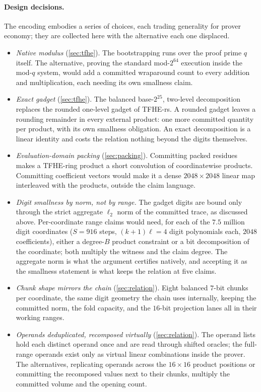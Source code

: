 \documentclass[11pt]{article}
\begin{document}
\paragraph{Design decisions.} The encoding embodies a series of choices, each trading generality for prover economy; they are collected here with the alternative each one displaced.
\begin{itemize}
  \item \emph{Native modulus} (\cref{sec:tfhe}). The bootstrapping runs over the proof prime $q$ itself. The alternative, proving the standard mod-$2^{64}$ execution inside the mod-$q$ system, would add a committed wraparound count to every addition and multiplication, each needing its own smallness claim.
  \item \emph{Exact gadget} (\cref{sec:tfhe}). The balanced base-$2^{25}$, two-level decomposition replaces the rounded one-level gadget of TFHE-rs. A rounded gadget leaves a rounding remainder in every external product: one more committed quantity per product, with its own smallness obligation. An exact decomposition is a linear identity and costs the relation nothing beyond the digits themselves.
  \item \emph{Evaluation-domain packing} (\cref{sec:packing}). Committing packed residues makes a TFHE-ring product a short convolution of coordinatewise products. Committing coefficient vectors would make it a dense $2048 \times 2048$ linear map interleaved with the products, outside the claim language.
  \item \emph{Digit smallness by norm, not by range.} The gadget digits are bound only through the strict aggregate $\ell_2$ norm of the committed trace, as discussed above. Per-coordinate range claims would need, for each of the $7.5$ million digit coordinates ($S = 916$ steps, $(k+1)\ell = 4$ digit polynomials each, $2048$ coefficients), either a degree-$B$ product constraint or a bit decomposition of the coordinate; both multiply the witness and the claim degree. The aggregate norm is what the argument certifies natively, and accepting it as the smallness statement is what keeps the relation at five claims.
  \item \emph{Chunk shape mirrors the chain} (\cref{sec:relation}). Eight balanced $7$-bit chunks per coordinate, the same digit geometry the chain uses internally, keeping the committed norm, the fold capacity, and the $16$-bit projection lanes all in their working ranges.
  \item \emph{Operands deduplicated, recomposed virtually} (\cref{sec:relation}). The operand lists hold each distinct operand once and are read through shifted oracles; the full-range operands exist only as virtual linear combinations inside the prover. The alternatives, replicating operands across the $16 \times 16$ product positions or committing the recomposed values next to their chunks, multiply the committed volume and the opening count.

\end{itemize}
\end{document}
